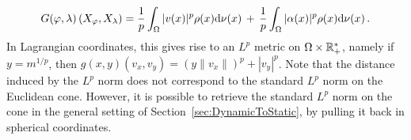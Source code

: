 \begin{multline}
G(\varphi,\lambda)\left(X_\varphi,X_\lambda \right)= \frac{1}{p} \int_{\Omega} | v(x)  |^p \rho(x)  \mathrm{d} \nu(x) \,+\, \frac{1}{p} \int_{\Omega}  | \alpha(x)|^p  \rho(x)  \mathrm{d} \nu(x) \,.
\end{multline}
In Lagrangian coordinates, this gives rise to an $L^p$ metric on $\Omega \times \mathbb{R}_+^*$, namely if $y=m^{1/p}$, then $g(x,y)(v_x,v_y) = (y \|v_x\|)^p + |v_y|^p$. Note that the distance induced by the $L^p$ norm does not correspond to the standard $L^p$ norm on the Euclidean cone. However, it is possible to retrieve the standard $L^p$ norm on the cone in the general setting of Section~\ref{sec:DynamicToStatic}, by pulling it back in spherical coordinates.


